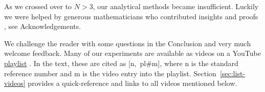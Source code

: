 As we crossed over to $N>3$, our analytical methods became insufficient. Luckily we were helped by generous mathematicians who contributed insights and proofs \cite{akopyan19_private_meromorphic,helman19,dominique19,olga19_mitten,sergei19_private_circles,sergei19_private_meromorphic}, see Acknowledgements. 

We challenge the reader with some questions in the Conclusion and very much welcome feedback. Many of our experiments are available as videos on a YouTube \href{https://bit.ly/2kTvPPr}{playlist} \cite{dsr_math_intell_playlist}. In the text, these are cited as {[n,~pl\#m]}, where n is the standard reference number and m is the video entry into the playlist. Section~\ref{sec:list-videos} provides a quick-reference and links to all videos mentioned below.